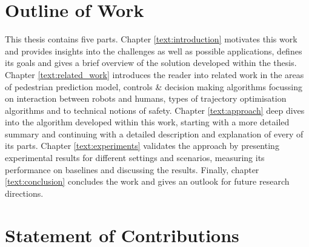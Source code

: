 
\section{Outline of Work}
\label{text:introduction/outline}
This thesis contains five parts. Chapter \ref{text:introduction} motivates this work and provides insights into the challenges as well as possible applications, defines its goals and gives a brief overview of the solution developed within the thesis. Chapter \ref{text:related_work} introduces the reader into related work in the areas of pedestrian prediction model, controls \& decision making algorithms focussing on interaction between robots and humans, types of trajectory optimisation algorithms and to technical notions of safety. Chapter \ref{text:approach} deep dives into the algorithm developed within this work, starting with a more detailed summary and continuing with a detailed description and explanation of every of its parts. Chapter \ref{text:experiments} validates the approach by presenting experimental results for different settings and scenarios, measuring its performance on baselines and discussing the results. Finally, chapter \ref{text:conclusion} concludes the work and gives an outlook for future research directions.

\section{Statement of Contributions}
\label{text:introduction/contributions}

